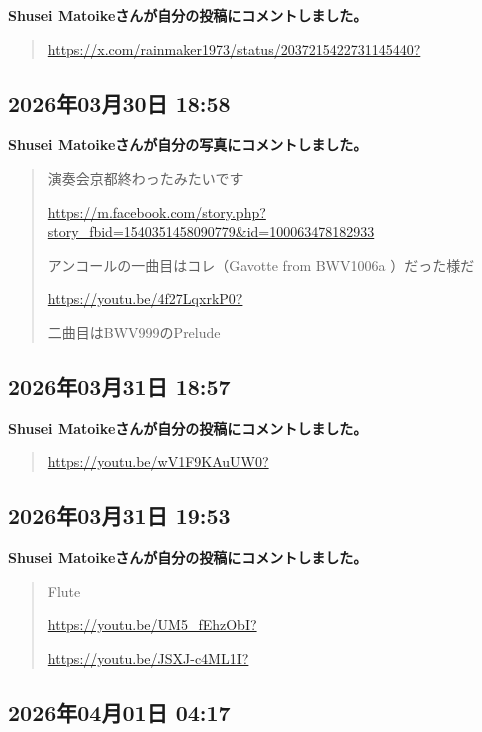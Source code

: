 \textbf{Shusei Matoikeさんが自分の投稿にコメントしました。}

\begin{quote}
\url{https://x.com/rainmaker1973/status/2037215422731145440?}
\end{quote}

\subsection*{2026年03月30日 18:58}

\textbf{Shusei Matoikeさんが自分の写真にコメントしました。}

\begin{quote}
演奏会京都終わったみたいです

\url{https://m.facebook.com/story.php?story_fbid=1540351458090779&id=100063478182933}

アンコールの一曲目はコレ（Gavotte from BWV1006a ）だった様だ

\url{https://youtu.be/4f27LqxrkP0?}

二曲目はBWV999のPrelude
\end{quote}

\subsection*{2026年03月31日 18:57}

\textbf{Shusei Matoikeさんが自分の投稿にコメントしました。}

\begin{quote}
\url{https://youtu.be/wV1F9KAuUW0?}
\end{quote}

\subsection*{2026年03月31日 19:53}

\textbf{Shusei Matoikeさんが自分の投稿にコメントしました。}

\begin{quote}
Flute

\url{https://youtu.be/UM5_fEhzObI?}

\url{https://youtu.be/JSXJ-c4ML1I?}
\end{quote}

\subsection*{2026年04月01日 04:17}


